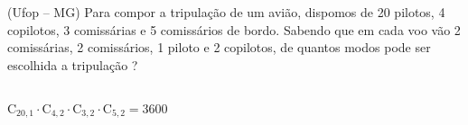 \begin{ex}
(Ufop – MG) Para compor a tripulação de um avião, dispomos de 20 pilotos, 4 copilotos, 3 comissárias e 5 comissários de bordo. Sabendo que em cada voo vão 2 comissárias, 2 comissários, 1 piloto e 2 copilotos, de quantos modos pode ser escolhida a tripulação ?
  \begin{sol}
    \phantom{A} \\
    $\mathrm{C}_{{20},1}\cdot\mathrm{C}_{4,2}\cdot\mathrm{C}_{3,2}\cdot\mathrm{C}_{5,2}=3600$
  \end{sol}
\end{ex}